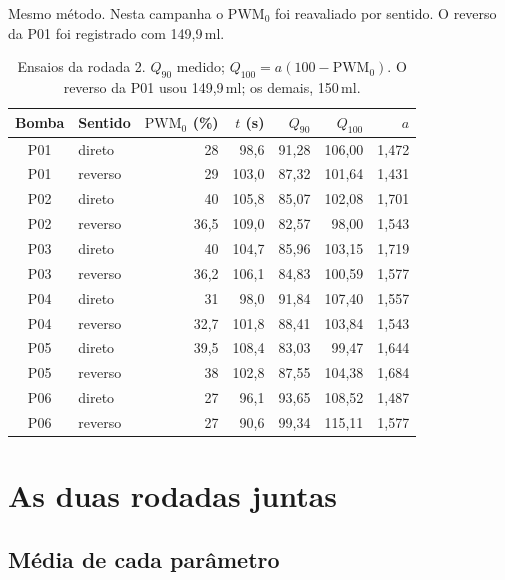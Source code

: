 \documentclass[11pt,a4paper]{article}
\newcommand{\pwmz}{\mathrm{PWM}_0}
\begin{document}
Mesmo método. Nesta campanha o $\pwmz$ foi reavaliado por sentido. O reverso
da P01 foi registrado com 149,9\,ml.

\begin{table}[ht]
\centering
\small
\caption{Ensaios da rodada 2. $Q_{90}$ medido; $Q_{100}=a(100-\pwmz)$.
O reverso da P01 usou 149,9\,ml; os demais, 150\,ml.}
\setlength{\tabcolsep}{4.2pt}
\begin{tabular}{@{}clrrrrr@{}}
\toprule
Bomba & Sentido & $\pwmz$ (\%) & $t$ (s) & $Q_{90}$ & $Q_{100}$ & $a$ \\
\midrule
P01 & direto  & 28 & 98,6 & 91,28 & 106,00 & 1,472 \\
P01 & reverso & 29 & 103,0 & 87,32 & 101,64 & 1,431 \\
P02 & direto  & 40 & 105,8 & 85,07 & 102,08 & 1,701 \\
P02 & reverso & 36,5 & 109,0 & 82,57 & 98,00 & 1,543 \\
P03 & direto  & 40 & 104,7 & 85,96 & 103,15 & 1,719 \\
P03 & reverso & 36,2 & 106,1 & 84,83 & 100,59 & 1,577 \\
P04 & direto  & 31 & 98,0 & 91,84 & 107,40 & 1,557 \\
P04 & reverso & 32,7 & 101,8 & 88,41 & 103,84 & 1,543 \\
P05 & direto  & 39,5 & 108,4 & 83,03 & 99,47 & 1,644 \\
P05 & reverso & 38 & 102,8 & 87,55 & 104,38 & 1,684 \\
P06 & direto  & 27 & 96,1 & 93,65 & 108,52 & 1,487 \\
P06 & reverso & 27 & 90,6 & 99,34 & 115,11 & 1,577 \\
\bottomrule
\end{tabular}
\end{table}

\section{As duas rodadas juntas}

\subsection{Média de cada parâmetro}
\end{document}
